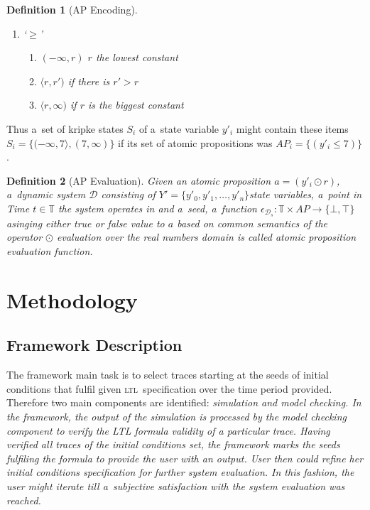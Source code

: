\documentclass[12pt,oneside,draft]{fithesis}
\newcommand{\ltl}{\textsc{ltl}~}
\newcommand{\mD}{\mathcal{D}}
\newcommand{\mTime}{\mathbb{T}}
\newcommand{\dStateVariables}{$Y'=\{y'_0,y'_1,\dotsc,y'_n\}$}
\newtheorem{mydef}{Definition}
\begin{document}
\begin{mydef}[AP Encoding]
\begin{enumerate}
\begin{enumerate}
				\item{$(r', r\rangle$} in case there is $r'<r$
				\item{$(r,\infty)$} in case $r$ is the biggest constant
			\end{enumerate}
		\item{`$\geq$'}
			\begin{enumerate}
				\item{$(-\infty,r)$} $r$ the lowest constant
				\item{$\langle r, r')$} if there is $r'>r$
				\item{$\langle r, \infty)$} if $r$ is the biggest
						constant
			\end{enumerate}
	\end{enumerate}
\end{mydef}
Thus a~set of kripke states $S_i$ of a~state variable $y'_i$ might
contain these items $S_i=\{(-\infty,7\rangle,(7,\infty)\}$ if
its set of atomic propositions was $AP_i=\{(y'_i \leq 7)\}$.

\begin{mydef}[AP Evaluation]
Given an atomic proposition $a=(y'_i\odot r)$, a~dynamic system $\mD$
consisting of \dStateVariables state variables, a~point in Time
$t\in\mTime$ the system operates in and a~seed, a~function
$\epsilon_{\mD_s}:\mTime\times AP\rightarrow\{\bot,\top\}$
asinging either true or false value to $a$ based on common semantics of
the operator $\odot$ evaluation over the real numbers domain
is called atomic proposition evaluation function.
\end{mydef}


\chapter{Methodology}
\section{Framework Description}
The framework main task is to select traces starting at the seeds of initial conditions
that fulfil given \ltl specification over the time period provided.
Therefore two main components are identified: \em simulation and model checking\rm{}.
In the framework, the output of the simulation is processed by the
model checking component to verify the LTL formula validity of a particular
trace. Having verified all traces of the initial conditions set, the framework
marks the seeds fulfiling the formula to provide the user with an output. 
User then could refine her initial conditions specification for further
system evaluation. In this fashion, the user might iterate till a~subjective satisfaction
with the system evaluation was reached.
\end{document}
